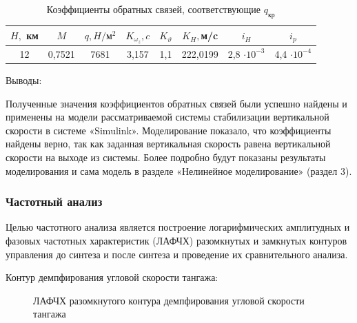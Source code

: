 \begin{table}[H]
    \centering
    \caption{Коэффициенты обратных связей, соответствующие $q_\text{кр}$}
    \begin{tabular}{|c|c|c|c|c|c|c|c|}
    \hline
        $H,$ км & $M$ & $q, H / \text{м}^2$ & $K_{\omega_z}, c$ & $K_\vartheta$ & $K_H,$м/c &$i_H$&$i_p$ \\ \hline
        12&0,7521 &7681 &3,157 & 1,1 &222,0199 &2,8 $\cdot 10^{-3}$&4,4 $\cdot 10^{-4}$\\ \hline
    \end{tabular}
    \label{tab:q_kr}
\end{table}

\begin{center}
    Выводы:
\end{center}

Полученные значения коэффициентов обратных связей были успешно найдены и применены на модели рассматриваемой системы стабилизации вертикальной скорости в системе «Simulink». Моделирование показало, что коэффициенты найдены верно, так как заданная вертикальная скорость равена вертикальной скорости на выходе из системы. Более подробно будут показаны результаты моделирования и сама модель в разделе «Нелинейное моделирование» (раздел 3).

\subsubsection{Частотный анализ}

Целью частотного анализа является построение логарифмических амплитудных и фазовых частотных характеристик (ЛАФЧХ) разомкнутых и замкнутых контуров управления до синтеза и после синтеза и проведение их сравнительного анализа.

\begin{center}
    Контур демпфирования угловой скорости тангажа:
\end{center}

\begin{figure}[H]
    \caption{ЛАФЧХ разомкнутого контура демпфирования угловой скорости тангажа}
    \label{fig:Угловая скорость тангажа раз qMIN}
\end{figure}

